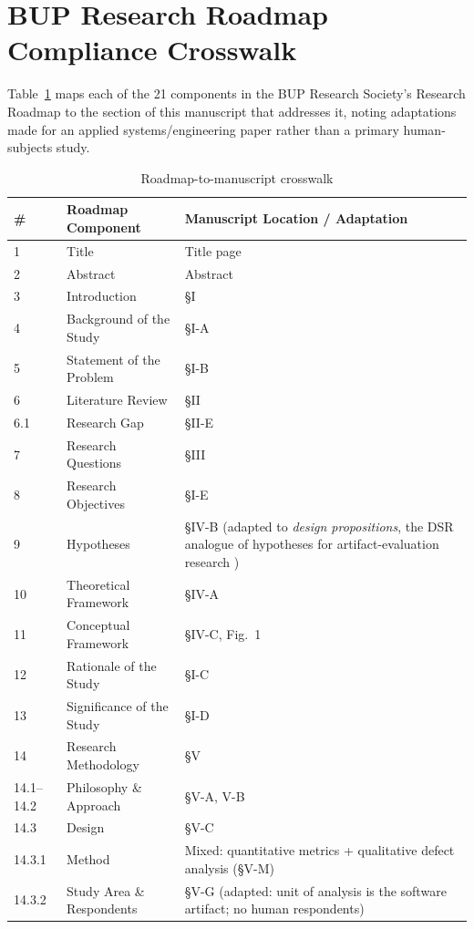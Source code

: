 \documentclass[conference]{IEEEtran}
\begin{document}
\appendices

\section{BUP Research Roadmap Compliance Crosswalk}
\label{app:crosswalk}
Table~\ref{tab:crosswalk} maps each of the 21 components in the BUP Research Society's Research Roadmap to the section of this manuscript that addresses it, noting adaptations made for an applied systems/engineering paper rather than a primary human-subjects study.

\begin{table}[h]
\caption{Roadmap-to-manuscript crosswalk}
\label{tab:crosswalk}
\centering
\footnotesize
\begin{tabular}{@{}p{0.4cm}p{2.3cm}p{4.9cm}@{}}
\toprule
\textbf{\#} & \textbf{Roadmap Component} & \textbf{Manuscript Location / Adaptation} \\
\midrule
1 & Title & Title page \\
2 & Abstract & Abstract \\
3 & Introduction & \S I \\
4 & Background of the Study & \S I-A \\
5 & Statement of the Problem & \S I-B \\
6 & Literature Review & \S II \\
6.1 & Research Gap & \S II-E \\
7 & Research Questions & \S III \\
8 & Research Objectives & \S I-E \\
9 & Hypotheses & \S IV-B (adapted to \emph{design propositions}, the DSR analogue of hypotheses for artifact-evaluation research \cite{hevner2004design}) \\
10 & Theoretical Framework & \S IV-A \\
11 & Conceptual Framework & \S IV-C, Fig.~1 \\
12 & Rationale of the Study & \S I-C \\
13 & Significance of the Study & \S I-D \\
14 & Research Methodology & \S V \\
14.1--14.2 & Philosophy \& Approach & \S V-A, V-B \\
14.3 & Design & \S V-C \\
14.3.1 & Method & Mixed: quantitative metrics + qualitative defect analysis (\S V-M) \\
14.3.2 & Study Area \& Respondents & \S V-G (adapted: unit of analysis is the software artifact; no human respondents) \\

\end{tabular}
\end{table}
\end{document}

